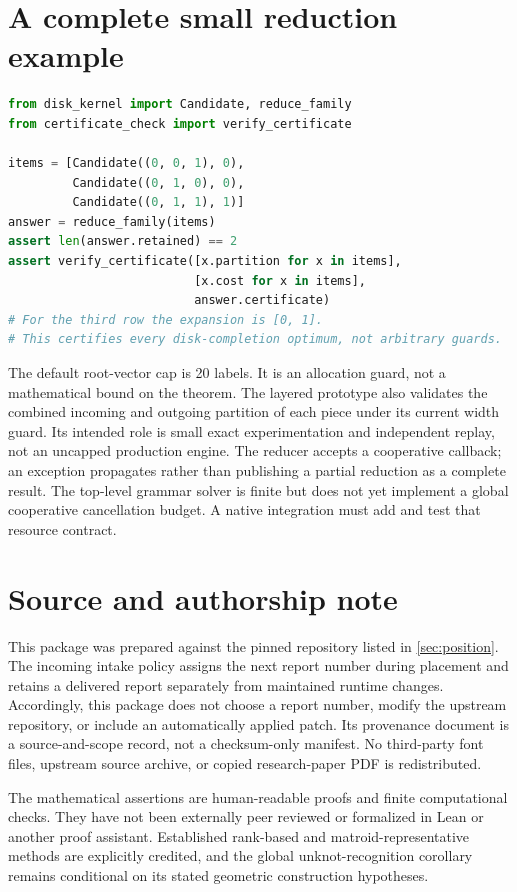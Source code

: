 \documentclass[11pt,a4paper]{article}
\theoremstyle{definition}
\theoremstyle{remark}
\begin{document}
\section{A complete small reduction example}
\begin{lstlisting}[language=Python]
from disk_kernel import Candidate, reduce_family
from certificate_check import verify_certificate

items = [Candidate((0, 0, 1), 0),
         Candidate((0, 1, 0), 0),
         Candidate((0, 1, 1), 1)]
answer = reduce_family(items)
assert len(answer.retained) == 2
assert verify_certificate([x.partition for x in items],
                          [x.cost for x in items],
                          answer.certificate)
# For the third row the expansion is [0, 1].
# This certifies every disk-completion optimum, not arbitrary guards.
\end{lstlisting}

The default root-vector cap is 20 labels. It is an allocation guard, not a mathematical
bound on the theorem. The layered prototype also validates the combined incoming and
outgoing partition of each piece under its current width guard. Its intended role is
small exact experimentation and independent replay, not an uncapped production engine.
The reducer accepts a cooperative callback; an exception propagates rather than
publishing a partial reduction as a complete result. The top-level grammar solver is
finite but does not yet implement a global cooperative cancellation budget. A native
integration must add and test that resource contract.

\section{Source and authorship note}
This package was prepared against the pinned repository listed in
\cref{sec:position}. The incoming intake policy assigns the next report number during
placement and retains a delivered report separately from maintained runtime changes.
Accordingly, this package does not choose a report number, modify the upstream
repository, or include an automatically applied patch. Its provenance document is a
source-and-scope record, not a checksum-only manifest. No third-party font files,
upstream source archive, or copied research-paper PDF is redistributed.

The mathematical assertions are human-readable proofs and finite computational checks.
They have not been externally peer reviewed or formalized in Lean or another proof
assistant. Established rank-based and matroid-representative methods are explicitly
credited, and the global unknot-recognition corollary remains conditional on its stated
geometric construction hypotheses.
\end{document}
